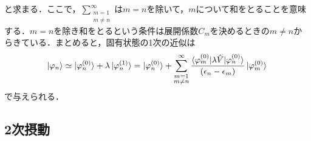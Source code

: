 と求まる．ここで，$\displaystyle\sum_{\substack{m=1 \\ m\neq n}}^\infty$は$m=n$を除いて，$m$について和をとることを意味する．$m=n$を除き和をとるという条件は展開係数$C_m$を決めるときの$m\neq n$からきている．まとめると，固有状態の1次の近似は
　\begin{align}
\ket{\varphi_{n}}\simeq\ket{\varphi_{n}^{(0)}}+\lambda\ket{\varphi_{n}^{(1)}}=\ket{\varphi_{n}^{(0)}}
+
\displaystyle\sum_{\substack{m=1 \\ m\neq n}}^\infty
 \frac{\braket{\varphi_{m}^{(0)}|\lambda\hat{V}|\varphi_{n}^{(0)}}}{(\epsilon_{n}-\epsilon_{m})}
\ket{\varphi_{m}^{(0)}}
\end{align}
で与えられる．













%
\subsection{2次摂動}
